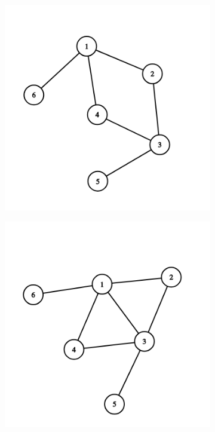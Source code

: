 \begin{solution}
\begin{figure}[H]
  \centering
  \begin{subfigure}[a]{0.24\linewidth}
    \includegraphics[width=\linewidth]{_img/344/12.png}
  \end{subfigure}
  \begin{subfigure}[a]{0.24\linewidth}
    \includegraphics[width=\linewidth]{_img/344/13.png}

\end{subfigure}
\end{figure}
\end{solution}
